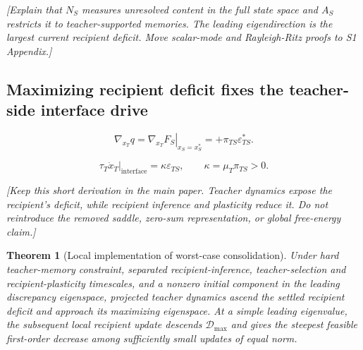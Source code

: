 \documentclass[10pt,letterpaper]{article}
\theoremstyle{plain}
\newtheorem{theorem}{Theorem}
\theoremstyle{remark}
\begin{document}
\textit{[Explain that $N_S$ measures unresolved content in the full state space and $A_S$ restricts it to teacher-supported memories. The leading eigendirection is the largest current recipient deficit. Move scalar-mode and Rayleigh-Ritz proofs to S1 Appendix.]}

\subsection{Maximizing recipient deficit fixes the teacher-side interface drive}

\begin{equation}
\nabla_{x_T}q
=
\left.\nabla_{x_T}F_S\right|_{x_S=x_S^*}
=
+\pi_{TS}\varepsilon_{TS}^*.
\label{eq:teacher-envelope}
\end{equation}

\begin{equation}
\tau_T\dot x_T\big|_{\mathrm{interface}}
=
\kappa\varepsilon_{TS},
\qquad
\boxed{\kappa=\mu_T\pi_{TS}>0.}
\label{eq:teacher-ascent-coupling}
\end{equation}

\textit{[Keep this short derivation in the main paper. Teacher dynamics expose the recipient's deficit, while recipient inference and plasticity reduce it. Do not reintroduce the removed saddle, zero-sum representation, or global free-energy claim.]}

\begin{theorem}[Local implementation of worst-case consolidation]
\label{thm:minimax-transfer}
Under hard teacher-memory constraint, separated recipient-inference, teacher-selection and recipient-plasticity timescales, and a nonzero initial component in the leading discrepancy eigenspace, projected teacher dynamics ascend the settled recipient deficit and approach its maximizing eigenspace. At a simple leading eigenvalue, the subsequent local recipient update descends $\mathcal D_{\max}$ and gives the steepest feasible first-order decrease among sufficiently small updates of equal norm.
\end{theorem}
\end{document}
